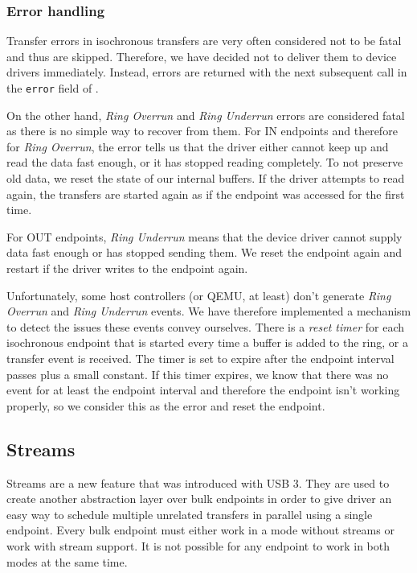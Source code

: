\subsubsection{Error handling}

Transfer errors in isochronous transfers are very often considered not to be fatal
and thus are skipped. Therefore, we have decided not to deliver them to device drivers
immediately. Instead, errors are returned with the next
subsequent  call in the \texttt{error} field of
.

On the other hand, \textit{Ring Overrun} and \textit{Ring Underrun} errors
are considered fatal as there is no simple way to recover from them. For IN
endpoints and therefore for \textit{Ring Overrun}, the error tells us that the
driver either cannot keep up and read the data fast enough, or it has stopped
reading completely. To not preserve old data, we reset the state of our
internal buffers. If the driver attempts to read again, the transfers are
started again as if the endpoint was accessed for the first time.

For OUT endpoints, \textit{Ring Underrun} means that the device driver cannot
supply data fast enough or has stopped sending them. We reset the endpoint
again and restart if the driver writes to the endpoint again.

Unfortunately, some host controllers (or QEMU, at least) don't generate
\textit{Ring Overrun} and \textit{Ring Underrun} events. We have therefore
implemented a mechanism to detect the issues these events convey ourselves.
There is a \textit{reset timer} for each isochronous endpoint that is started
every time a buffer is added to the ring, or a transfer event is received. The
timer is set to expire after the endpoint interval passes plus a small
constant. If this timer expires, we know that there was no event for at least
the endpoint interval and therefore the endpoint isn't working properly, so we
consider this as the error and reset the endpoint.

\subsection{Streams}

Streams are a new feature that was introduced with USB 3. They are used to
create another abstraction layer over bulk endpoints in order to give driver
an easy way to schedule multiple unrelated transfers in parallel using a single
endpoint. Every bulk endpoint must either work in a mode without streams or
work with stream support. It is not possible for any endpoint to work in both
modes at the same time.

